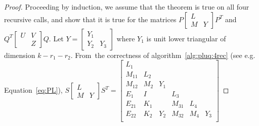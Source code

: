 \documentclass{article}
\begin{document}
\begin{proof}
Proceeding by induction, we assume that the theorem is true on all four
recursive calls, and show that it is true for the matrices 
$P
  \left[\begin{smallmatrix}
    L \\
    M&Y
  \end{smallmatrix}\right]
P^T$
and 
$Q^T
  \left[\begin{smallmatrix}
    U&V \\
    &Z
  \end{smallmatrix}\right]
Q$.
Let $Y=
\begin{bmatrix}
  Y_1\\Y_2&Y_3
\end{bmatrix}$
where $Y_{1}$ is unit lower triangular of dimension $k-r_1-r_2$.
From~the correctness of algorithm~\ref{alg:pluq:4rec} (see e.g. Equation~\ref{eq:PL}),
$  S
  \begin{bmatrix}
    L\\
    M&Y
  \end{bmatrix}
  S^T
  =
\left[
        \begin{array}{ccccccc}
          L_1  \\
          M_{11} & L_2\\
          M_{12} & M_2 &Y_1&       \\
          \hline
          E_1   &  I  &&L_3\\
          E_{21} &K_1 & &M_{31}  & L_4\\
          E_{22} &K_2 & Y_2&M_{32}  & M_4&Y_3\\
        \end{array}
      \right]
$



\end{proof}
\end{document}

